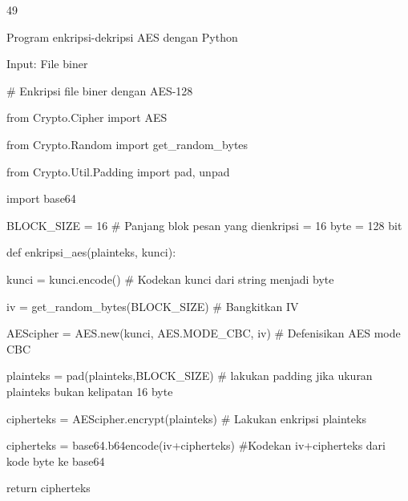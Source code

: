 \documentclass{article}
\begin{document}

49

Program enkripsi-dekripsi AES dengan Python

Input: File biner

\# Enkripsi file biner dengan AES-128

from Crypto.Cipher import AES

from Crypto.Random import get\_random\_bytes

from Crypto.Util.Padding import pad, unpad

import base64

BLOCK\_SIZE = 16      \# Panjang blok pesan yang dienkripsi = 16 byte = 128 bit

def enkripsi\_aes(plainteks, kunci):                     

    kunci = kunci.encode()                              \# Kodekan kunci dari string menjadi byte

    iv = get\_random\_bytes(BLOCK\_SIZE)                   \# Bangkitkan IV

    AEScipher = AES.new(kunci, AES.MODE\_CBC, iv)        \# Defenisikan AES mode CBC  


    plainteks = pad(plainteks,BLOCK\_SIZE)  \# lakukan padding jika ukuran plainteks bukan kelipatan 16 byte   


    cipherteks = AEScipher.encrypt(plainteks)           \# Lakukan enkripsi plainteks 

    cipherteks = base64.b64encode(iv+cipherteks)        \#Kodekan iv+cipherteks dari kode byte ke base64

    return cipherteks
\end{document}
